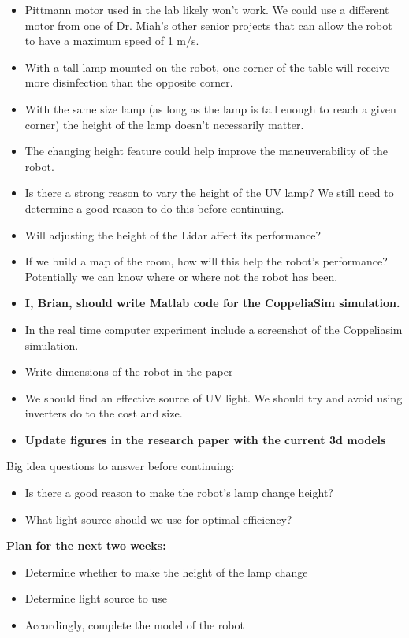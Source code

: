 \documentclass[fontsize=11pt, %
                             paper=a4, %
                             twoside, %
                             captions=tableheading,
                             index=totoc,
                             hyperref]{labbook}
\begin{document}
\begin{addmargin}[0cm]{0cm}
\begin{itemize}
\item Pittmann motor used in the lab likely won't work. We could use a different motor from one of Dr. Miah's other senior projects that can allow the robot to have a maximum speed of 1 m/s.
\item With a tall lamp mounted on the robot, one corner of the table will receive more disinfection than the opposite corner.
\item With the same size lamp (as long as the lamp is tall enough to reach a given corner) the height of the lamp doesn't necessarily matter.
\item The changing height feature could help improve the maneuverability of the robot.
\item Is there a strong reason to vary the height of the UV lamp? We still need to determine a good reason to do this before continuing.
\item Will adjusting the height of the Lidar affect its performance?
\item If we build a map of the room, how will this help the robot's performance? Potentially we can know where or where not the robot has been.
\item \textbf{I, Brian, should write Matlab code for the CoppeliaSim simulation.}
\item In the real time computer experiment include a screenshot of the Coppeliasim simulation.
\item Write dimensions of the robot in the paper
\item We should find an effective source of UV light. We should try and avoid using inverters do to the cost and size.
\item \textbf{Update figures in the research paper with the current 3d models}
\end{itemize}
Big idea questions to answer before continuing:
\begin{itemize}
\item Is there a good reason to make the robot's lamp change height?
\item What light source should we use for optimal efficiency?
\end{itemize}
\textbf{Plan for the next two weeks:}
\begin{itemize}
\item Determine whether to make the height of the lamp change
\item Determine light source to use
\item Accordingly, complete the model of the robot
\end{itemize}


\end{addmargin}
\end{document}

